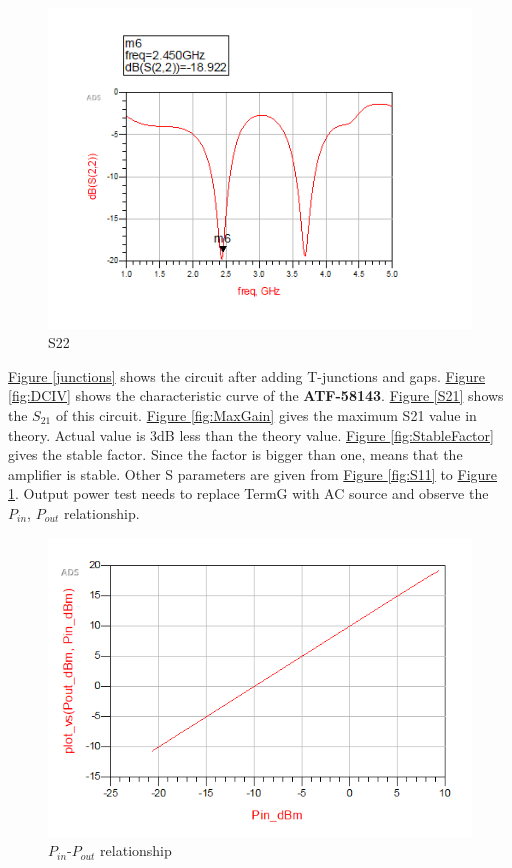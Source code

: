 \documentclass[12pt,a4paper]{report}
\begin{document}
\begin{figure}
    \centerline{\includegraphics{S22.PNG}}
    \caption{S22}
    \label{fig:S22}
\end{figure}
\hyperref[junctions]{Figure \ref*{junctions}} shows the circuit after adding T-junctions and gaps. \hyperref[fig:DCIV]{Figure \ref*{fig:DCIV}} shows the characteristic curve of the \textbf{ATF-58143}.
\hyperref[S21]{Figure \ref*{S21}} shows the $S_{21}$ of this circuit. \hyperref[fig:MaxGain]{Figure \ref*{fig:MaxGain}} gives the maximum S21 value in theory.
Actual value is 3dB less than the theory value. \hyperref[fig:StableFactor]{Figure \ref*{fig:StableFactor}} gives the stable factor. Since the factor is bigger than one, means that the amplifier is stable. Other S parameters are given from \hyperref[fig:S11]{Figure \ref*{fig:S11}}
to \hyperref[fig:S22]{Figure \ref*{fig:S22}}. 
 Output power test needs to replace TermG with AC source and observe the $P_{in}$, $P_{out}$ relationship.
\begin{figure}[H]
    \centerline{\includegraphics[]{P_inP_out.PNG}}
    \caption{$P_{in}$-$P_{out}$ relationship}
    \label{inout}
\end{figure}
\end{document}
